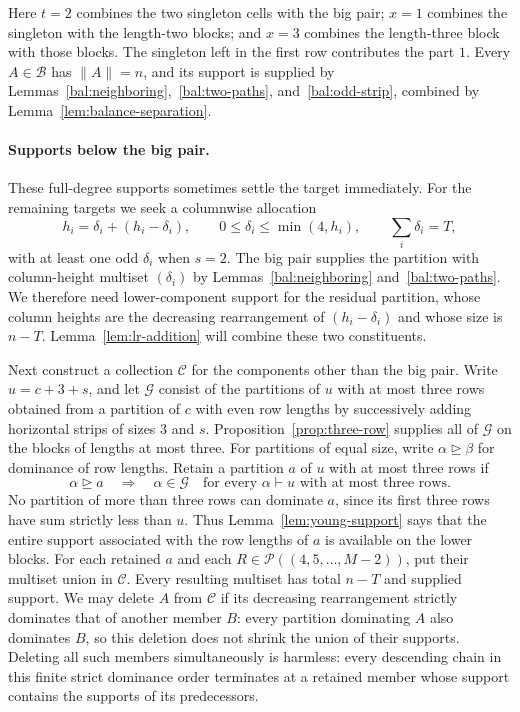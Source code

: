 Here $t=2$ combines the two singleton cells with the big pair;
$x=1$ combines the singleton with the length-two blocks; and
$x=3$ combines the length-three block with those blocks.
The singleton left in the first row contributes the part $1$.
Every $A\in\mathcal B$ has $\|A\|=n$, and its support is
supplied by Lemmas~\ref{bal:neighboring},~\ref{bal:two-paths},
and~\ref{bal:odd-strip}, combined by
Lemma~\ref{lem:balance-separation}.

\paragraph{Supports below the big pair.}
These full-degree supports sometimes settle the target immediately.
For the remaining targets we seek a columnwise allocation
\[
 h_i=\delta_i+(h_i-\delta_i),\qquad
 0\le\delta_i\le\min(4,h_i),\qquad \sum_i\delta_i=T,
\]
with at least one odd $\delta_i$ when $s=2$.
The big pair supplies the partition with column-height multiset
$(\delta_i)$ by Lemmas~\ref{bal:neighboring} and~\ref{bal:two-paths}.
We therefore need lower-component support for the residual partition,
whose column heights are the decreasing rearrangement of
$(h_i-\delta_i)$ and whose size is $n-T$.
Lemma~\ref{lem:lr-addition} will combine these two constituents.

Next construct a collection $\mathcal C$ for the components other
than the big pair. Write $u=c+3+s$, and let $\mathcal G$ consist of
the partitions of $u$ with at most three rows obtained from a
partition of $c$ with even row lengths by successively adding
horizontal strips of sizes $3$ and $s$.
Proposition~\ref{prop:three-row} supplies all of $\mathcal G$ on the
blocks of lengths at most three. For partitions of equal size,
write $\alpha\unrhd\beta$ for dominance of row lengths. Retain a
partition $a$ of $u$ with at most three rows if
\begin{equation}
 \alpha\unrhd a\quad\Longrightarrow\quad\alpha\in\mathcal G
 \quad\text{for every $\alpha\vdash u$ with at most three rows}.
 \label{eq:capacity-low-mask}
\end{equation}
No partition of more than three rows can dominate $a$, since its
first three rows have sum strictly less than $u$. Thus
Lemma~\ref{lem:young-support} says that the entire support associated
with the row lengths of $a$ is available on the lower blocks.
For each retained $a$ and each
$R\in\mathcal P((4,5,\ldots,M-2))$, put their multiset union in
$\mathcal C$. Every resulting multiset has total $n-T$ and supplied
support. We may delete $A$ from $\mathcal C$ if its decreasing
rearrangement strictly dominates that of another member $B$:
every partition dominating $A$ also dominates $B$, so this deletion
does not shrink the union of their supports. Deleting all such
members simultaneously is harmless: every descending chain in this
finite strict dominance order terminates at a retained member whose
support contains the supports of its predecessors.

